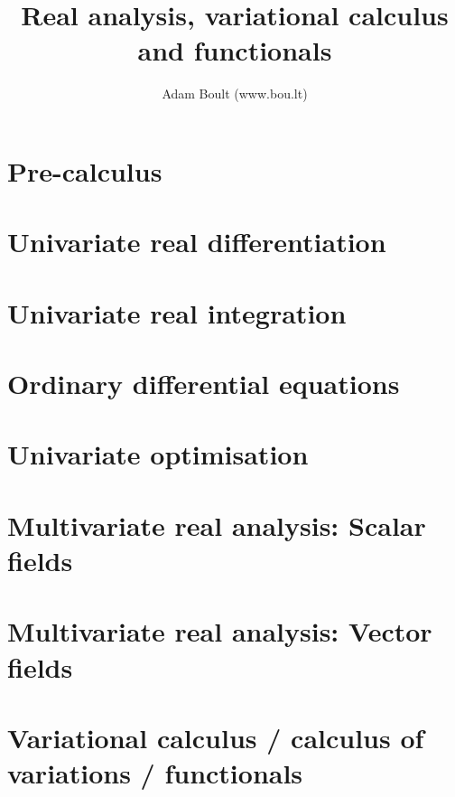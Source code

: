 \documentclass[oneside]{book}
\begin{document}
\author{Adam Boult (www.bou.lt)}
\title{Real analysis, variational calculus and functionals}
\maketitle

\setcounter{tocdepth}{0}
\tableofcontents



\part{Pre-calculus}






\part{Univariate real differentiation}







\part{Univariate real integration}






\part{Ordinary differential equations}



\part{Univariate optimisation}


\part{Multivariate real analysis: Scalar fields}





\part{Multivariate real analysis: Vector fields}





\part{Variational calculus / calculus of variations / functionals}

\end{document}
